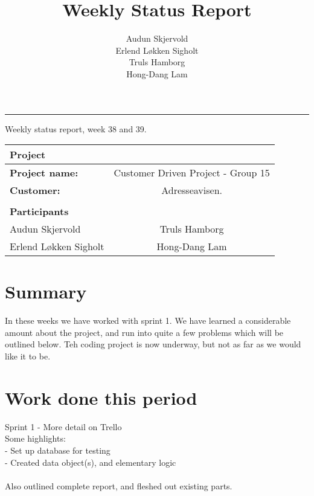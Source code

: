\documentclass[12pt, a4paper]{article}
\title{Weekly Status Report}
\author{Audun Skjervold \\ Erlend Løkken Sigholt \\ Truls Hamborg \\ Hong-Dang Lam}
\begin{document}
\maketitle
\newpage

 
\newpage
\hrule
\newpage

\begin{center}
Weekly status report, week 38 and 39.
  \begin{tabular}{| l  c |}
    \hline
    Project & \\ \hline
    \textbf{Project name:} & Customer Driven Project - Group 15 \\
    \textbf{Customer:} & Adresseavisen. \\ \hline
     & \\
     \textbf{Participants} & \\ \hline
     Audun Skjervold & Truls Hamborg \\
     Erlend Løkken Sigholt & Hong-Dang Lam \\
    \hline
  \end{tabular}
  \end{center}




\section{Summary}
In these weeks we have worked with sprint 1. We have learned a considerable amount about the project, and run into quite a few problems which will be outlined below. Teh coding project is now underway, but not as far as we would like it to be.
\section{Work done this period}
Sprint 1 - More detail on Trello\\
Some highlights:\\
- Set up database for testing\\
- Created data object(s), and elementary logic\\
\\
Also outlined complete report, and fleshed out existing parts.
\end{document}
